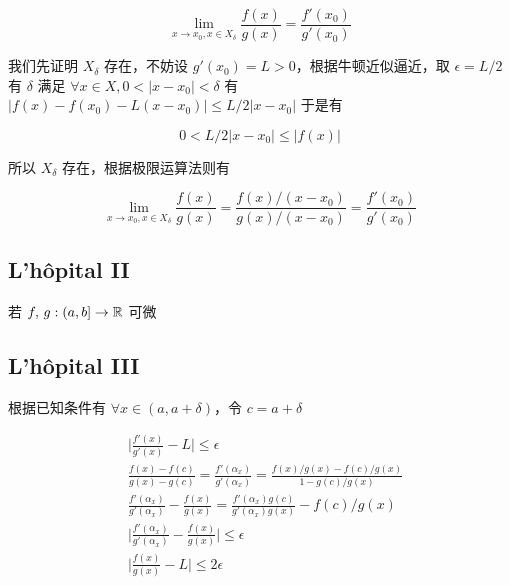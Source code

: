 \[
\lim_{x \to x_0, x \in X_{\delta}} \frac{f(x)}{g(x)} = \frac{f'(x_0)}{g'(x_0)}
\]

我们先证明 $X_{\delta}$ 存在，不妨设 $g'(x_0) = L > 0$，根据牛顿近似逼近，取 $\epsilon = L/2$ 有 $\delta$ 满足 $\forall x \in X, 0 < \lvert x -x_0\rvert < \delta$ 有
$ \lvert f(x) - f(x_0) - L(x-x_0)\rvert \le L/2 \lvert x -x_0 \rvert$
于是有 

\[
0 < L/2 \lvert x -x_0 \rvert\le \lvert f(x) \rvert
\]

所以 $X_{\delta}$ 存在，根据极限运算法则有

\[
\lim_{x \to x_0, x \in X_{\delta}} \frac{f(x)}{g(x)} = \frac{f(x)/(x-x_0)}{g(x)/(x-x_0)} = \frac{f'(x_0)}{g'(x_0)}
\]


\subsection{L'h\^{o}pital II}

若 $f,\,g : (a,b] \to \mathbb{R}$ 可微


\subsection{L'h\^{o}pital III}

根据已知条件有 $\forall x \in (a, a+\delta)$，令 $c = a + \delta$

\begin{align*}
    & \lvert \frac{f'(x)}{g'(x)} - L \rvert \le \epsilon \\
    & \frac{f(x) - f(c)}{g(x) - g(c)} = \frac{f'(\alpha_x)}{g'(\alpha_x)}= \frac{f(x)/g(x)- f(c)/g(x)}{1- g(c)/g(x)} \\
    & \frac{f'(\alpha_x)}{g'(\alpha_x)} - \frac{f(x)}{g(x)} = \frac{f'(\alpha_x)g(c)}{g'(\alpha_x) g(x)} -f(c)/g(x) \\
    & \lvert \frac{f'(\alpha_x)}{g'(\alpha_x)} - \frac{f(x)}{g(x)}  \rvert \le \epsilon \\
    & \lvert \frac{f(x)}{g(x)}  - L \rvert \le 2\epsilon \\
\end{align*}